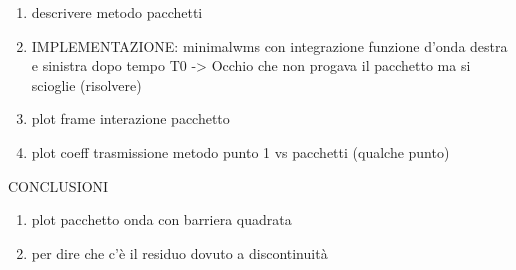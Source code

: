 \begin{enumerate}
\item descrivere metodo pacchetti
\item IMPLEMENTAZIONE: minimalwms con integrazione funzione d'onda destra e sinistra
dopo tempo T0
-> Occhio che non progava il pacchetto ma si scioglie (risolvere)
\item plot frame interazione pacchetto
\item plot coeff trasmissione metodo punto 1 vs pacchetti (qualche punto)
\end{enumerate}

CONCLUSIONI
\begin{enumerate}
\item plot pacchetto onda con barriera quadrata
\item per dire che c'è il residuo dovuto a discontinuità
\end{enumerate}
